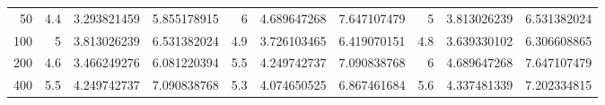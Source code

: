 \begin{tabular}{rrrrrrrrrr}
50 & 4.4 & 3.293821459 & 5.855178915 & 6 & 4.689647268 & 7.647107479 & 5 & 3.813026239 & 6.531382024 \\
100 & 5 & 3.813026239 & 6.531382024 & 4.9 & 3.726103465 & 6.419070151 & 4.8 & 3.639330102 & 6.306608865 \\
200 & 4.6 & 3.466249276 & 6.081220394 & 5.5 & 4.249742737 & 7.090838768 & 6 & 4.689647268 & 7.647107479 \\
400 & 5.5 & 4.249742737 & 7.090838768 & 5.3 & 4.074650525 & 6.867461684 & 5.6 & 4.337481339 & 7.202334815 \\
\end{tabular}
